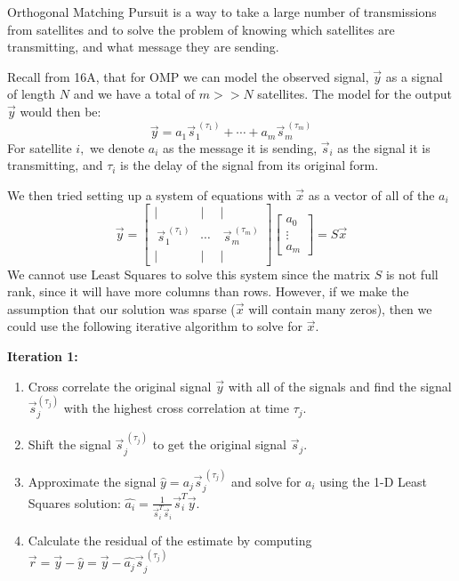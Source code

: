 

Orthogonal Matching Pursuit is a way to take a large number of transmissions from satellites and to solve the problem of knowing which satellites are transmitting, and what message they are sending.

Recall from 16A, that for OMP we can model the observed signal, $\vec{y}$ as a signal of length $N$ and we have a total of $m >> N$ satellites. The model for the output $\vec{y}$ would then be:
\begin{equation}
\vec{y} = a_{1} \vec{s}_{1}^{\ (\tau_{1})} + \cdots + a_m \vec{s}_{m}^{\ (\tau_{m})}
\end{equation}
For satellite $i,$ we denote $a_{i}$ as the message it is sending, $\vec{s}_{i}$ as the signal it is transmitting, and $\tau_{i}$ is the delay of the signal from its original form. 

We then tried setting up a system of equations with $\vec{x}$ as a vector of all of the $a_i$
\begin{equation}
\vec{y} = 
\begin{bmatrix} 
| & | & | \\
\ \vec{s}_{1}^{\ (\tau_{1})} & \cdots & \ \vec{s}_{m}^{\ (\tau_{m})} \\
| & | & | 
\end{bmatrix}
\begin{bmatrix} a_{0} \\ \vdots \\ a_{m} \end{bmatrix} = S \vec{x} 
\end{equation}
We cannot use Least Squares to solve this system since the matrix $S$ is not full rank, since it will have more columns than rows.
However, if we make the assumption that our solution was sparse ($\vec{x}$ will contain many zeros), then we could use the following iterative algorithm to solve for $\vec{x}.$

\textbf{Iteration 1:}
\begin{enumerate}[label=(\arabic*)]
  \item Cross correlate the original signal $\vec{y}$ with all of the signals and find the signal $\vec{s}_{j}^{({\tau_{j}})}$ with the highest cross correlation at time $\tau_{j}.$
  \item Shift the signal $\vec{s}_{j}^{\ (\tau_{j})}$ to get the original signal $\vec{s}_{j}.$
  \item Approximate the signal $\hat{y} = a_{j} \vec{s}_{j}^{\ (\tau_{j})}$ and solve for $a_{i}$ using the 1-D Least Squares solution: $\hat{a_{i}} = \frac{1}{\vec{s}_{i}^{T} \vec{s}_{i}} \vec{s}_{i}^{T} \vec{y}.$
  \item Calculate the residual of the estimate by computing $\vec{r} = \vec{y} - \hat{y} = \vec{y} - \hat{a_{j}} \vec{s}_{j}^{\ (\tau_{j})}$
\end{enumerate}

